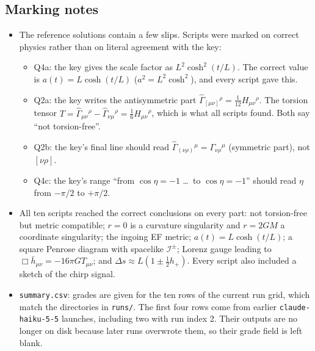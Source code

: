 \documentclass[11pt]{article}
\begin{document}
\subsection*{Marking notes}
\begin{itemize}
\item The reference solutions contain a few slips. Scripts were marked on correct physics rather than on literal agreement with the key:
  \begin{itemize}
  \item Q4a: the key gives the scale factor as $L^2\cosh^2(t/L)$. The correct value is $a(t)=L\cosh(t/L)$ ($a^2 = L^2\cosh^2$), and every script gave this.
  \item Q2a: the key writes the antisymmetric part $\hat\Gamma_{[\mu\nu]}{}^\rho = \tfrac{1}{12}H_{\mu\nu}{}^\rho$. The torsion tensor
        $T = \hat\Gamma_{\mu\nu}{}^\rho-\hat\Gamma_{\nu\mu}{}^\rho = \tfrac16 H_{\mu\nu}{}^\rho$, which is what all scripts found. Both say ``not torsion-free''.
  \item Q2b: the key's final line should read $\hat\Gamma_{(\nu\rho)}{}^\mu = \Gamma_{\nu\rho}{}^\mu$ (symmetric part), not $[\nu\rho]$.
  \item Q4c: the key's range ``from $\cos\eta=-1$ \ldots\ to $\cos\eta=-1$'' should read $\eta$ from $-\pi/2$ to $+\pi/2$.
  \end{itemize}
\item All ten scripts reached the correct conclusions on every part: not torsion-free but metric compatible; $r=0$ is a curvature singularity
  and $r=2GM$ a coordinate singularity; the ingoing EF metric; $a(t)=L\cosh(t/L)$; a square Penrose diagram with spacelike
  $\mathcal{I}^\pm$; Lorenz gauge leading to $\Box\bar h_{\mu\nu}=-16\pi G T_{\mu\nu}$; and $\Delta s \approx L(1\pm\tfrac12 h_+)$.
  Every script also included a sketch of the chirp signal.
\item \texttt{summary.csv}: grades are given for the ten rows of the current run grid, which match the directories in \texttt{runs/}.
  The first four rows come from earlier \texttt{claude-haiku-5-5} launches, including two with run index 2. Their outputs are no longer
  on disk because later runs overwrote them, so their grade field is left blank.
\end{itemize}
\end{document}
